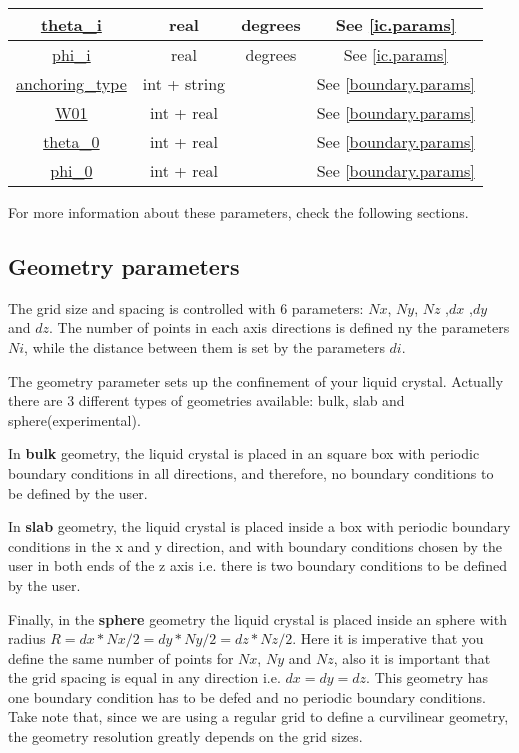 \documentclass{article}
\begin{document}
\begin{center}
\begin{longtable}{|c|c|c|c|}
          \hline 
          \hyperref[ic.param]{theta\_i} &	real & degrees & See \ref{ic.params} \\ 
          \hline 
          \hyperref[ic.param]{phi\_i} &	real & degrees  & See \ref{ic.params}\\ 
          \hline 
          \hyperref[boundary.params]{anchoring\_type} & int + string & & See \ref{boundary.params}\\ 
          \hline 
          \hyperref[boundary.params]{W01}& int + real & &  See \ref{boundary.params}  \\ 
          \hline 
          \hyperref[boundary.params]{theta\_0} &  int + real  & & See \ref{boundary.params} \\ 
          \hline 
          \hyperref[boundary.params]{phi\_0} &	 int + real  & & See \ref{boundary.params} \\ 
          \hline 
	\end{longtable} 
\end{center}

For more information about these parameters, check the following sections.


\subsection{Geometry parameters}\label{geometry}

The grid size and spacing is controlled with 6 parameters: $Nx$, $Ny$,
$Nz$ ,$dx$ ,$dy$ and $dz$. The number of points in each axis
directions is defined ny the parameters $Ni$, while the distance
between them is set by the parameters $di$.

The geometry parameter sets up the confinement of your liquid
crystal. Actually there are 3 different types of geometries available:
bulk, slab and sphere(experimental).

In \textbf{bulk} geometry, the liquid crystal is placed in an square box
with periodic boundary conditions in all directions, and therefore, no boundary conditions to be defined by the user.

In \textbf{slab} geometry, the liquid crystal is placed inside a box
with periodic boundary conditions in the x and y direction, and with
boundary conditions chosen by the user in both ends of the z
axis i.e. there is two boundary conditions to be defined by the user. 

Finally, in the \textbf{sphere} geometry the liquid crystal is placed
inside an sphere with radius $R=dx*Nx/2=dy*Ny/2=dz*Nz/2$. Here it
is imperative that you define the same number of points for $Nx$, $Ny$
and $Nz$, also it is important that the grid spacing is equal in any
direction i.e. $dx=dy=dz$. This geometry has one boundary condition
has to be defed and no periodic boundary conditions. Take note that,
since we are using a regular grid to define a curvilinear geometry,
the geometry resolution greatly depends on the grid sizes.
\end{document}
